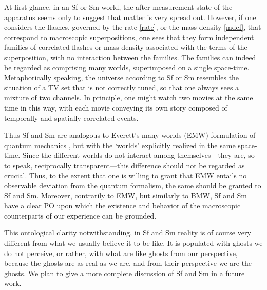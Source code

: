 \documentclass[12pt]{article}
\begin{document}
At first glance, in an {\sf Sf} or {\sf Sm} world, the after-measurement state of the  
apparatus seems only to suggest  that matter is very spread out.
However, if one considers the flashes, governed by the rate \eqref{rate}, or the mass density \eqref{mdef}, that correspond to  macroscopic superpositions, one sees that they form independent families 
of correlated flashes or mass density associated with the terms of the superposition, with no interaction between the families. The families can indeed be regarded as comprising many worlds, superimposed on a single space-time.  Metaphorically speaking, the universe according to {\sf Sf} or {\sf Sm} resembles the situation of a TV set that is not correctly tuned, so that one  always sees a mixture of two channels. In principle,  one might watch two movies at the same time in this way, with each movie conveying its own story composed of temporally and spatially correlated events.

Thus {\sf Sf} and {\sf Sm} are analogous to Everett's many-worlds ({\sf EMW}) formulation of quantum mechanics \citep{everett}, but with  the `worlds'  explicitly realized in the same space-time.
Since the different worlds do not interact among themselves---they are, so to speak, reciprocally transparent---this difference should not be regarded as crucial. Thus, to the extent that one is willing to grant that {\sf EMW} entails no observable deviation from the quantum  formalism, the same should be granted to {\sf Sf} and {\sf Sm}.  
Moreover, contrarily to {\sf EMW}, but similarly to {\sf BMW}, {\sf Sf} and
{\sf Sm} have a clear PO upon which the existence and behavior of the macroscopic counterparts of our experience  can be 
grounded. 

This ontological clarity notwithstanding, in {\sf Sf} and {\sf Sm} reality is of course very different from what we usually believe it  to be like. It is populated with ghosts we do not perceive, or rather, with what are like ghosts from our perspective, because the ghosts are as real as we are, and from their perspective we are the ghosts. We plan to give a more complete discussion of {\sf Sf} and {\sf Sm} in a future work.
\end{document}
